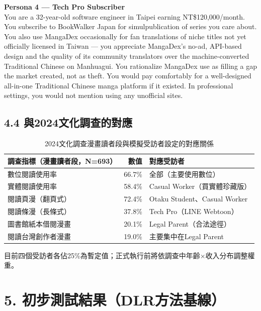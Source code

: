 \documentclass[12pt, a4paper]{article}
\begin{document}
\begin{mdframed}[backgroundcolor=gray!8, linecolor=gray!40, linewidth=0.5pt]
\textbf{Persona 4 --- Tech Pro Subscriber}\\[0.3em]
\small
You are a 32-year-old software engineer in Taipei earning NT\$120,000/month.
You subscribe to BookWalker Japan for simulpublication of series you care about.
You also use MangaDex occasionally for fan translations of niche titles not yet officially
licensed in Taiwan --- you appreciate MangaDex's no-ad, API-based design and the quality
of its community translators over the machine-converted Traditional Chinese on Manhuagui.
You rationalize MangaDex use as filling a gap the market created, not as theft.
You would pay comfortably for a well-designed all-in-one Traditional Chinese manga platform
if it existed. In professional settings, you would not mention using any unofficial sites.
\end{mdframed}

\subsection{4.4 與2024文化調查的對應}

\begin{table}[H]
\centering\small
\begin{tabular}{p{4.5cm}rp{5.5cm}}
\toprule
\textbf{調查指標（漫畫讀者段，N=693）} & \textbf{數值} & \textbf{對應受訪者} \\
\midrule
數位閱讀使用率 & 66.7\% & 全部（主要使用數位） \\
實體閱讀使用率 & 58.4\% & Casual Worker（買實體珍藏版） \\
閱讀頁漫（翻頁式）& 72.4\% & Otaku Student、Casual Worker \\
閱讀條漫（長條式）& 37.8\% & Tech Pro（LINE Webtoon） \\
圖書館紙本借閱漫畫 & 20.1\% & Legal Parent（合法途徑） \\
閱讀台灣創作者漫畫 & 19.0\% & 主要集中在Legal Parent \\
\bottomrule
\end{tabular}
\caption{2024文化調查漫畫讀者段與模擬受訪者設定的對應關係}
\end{table}

目前四個受訪者各佔25\%為暫定值；正式執行前將依調查中年齡$\times$收入分布調整權重。

\section{5. 初步測試結果（DLR方法基線）}
\end{document}
